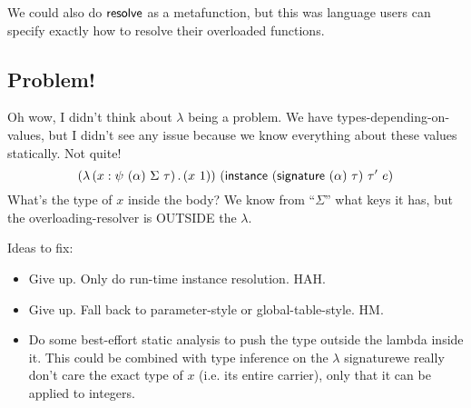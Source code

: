 \documentclass{article}
\begin{document}
\begin{mathpar}




\end{mathpar}
We could also do $\kres$ as a metafunction, but this was language users can specify exactly how to resolve their overloaded functions.

\subsection*{Problem!}
Oh wow, I didn't think about $\lambda$ being a problem.
We have types-depending-on-values, but I didn't see any issue because we know everything about these values statically.
Not quite!
$$(\lambda\,(x : \kpsi{\alpha}{\Sigma}{\tau})\,.\,(x~1))~(\kinst~(\ksig~(\alpha)~\tau)~\tau'~e)$$
What's the type of $x$ inside the body?
We know from ``$\Sigma$'' what keys it has, but the overloading-resolver is OUTSIDE the $\lambda$.

Ideas to fix:
\begin{itemize}
\item Give up. Only do run-time instance resolution. HAH.
\item Give up. Fall back to parameter-style or global-table-style. HM.
\item Do some best-effort static analysis to push the type outside the lambda inside it.
  This could be combined with type inference on the $\lambda$ signature\textemdash we really don't care the exact type of $x$ (i.e. its entire carrier), only that it can be applied to integers.
\end{itemize}
\end{document}

